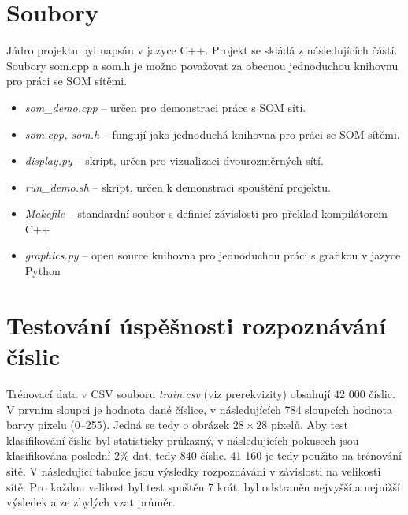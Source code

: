 \documentclass[12pt]{article}
\begin{document}
\section*{Soubory}
Jádro projektu byl napsán v jazyce C++. Projekt se skládá z následujících částí. Soubory som.cpp a som.h je možno považovat za obecnou jednoduchou knihovnu pro práci se SOM sítěmi.

\begin{itemize}
    \item \textit{som\_demo.cpp} -- určen pro demonstraci práce s SOM sítí.
    \item \textit{som.cpp, som.h} -- fungují jako jednoduchá knihovna pro práci se SOM sítěmi.
    \item \textit{display.py} -- skript, určen pro vizualizaci dvourozměrných sítí.
    \item \textit{run\_demo.sh} -- skript, určen k demonstraci spouštění projektu.
    \item \textit{Makefile} -- standardní soubor s definicí závislostí pro překlad kompilátorem C++ 
    \item \textit{graphics.py} -- open source knihovna pro jednoduchou práci s grafikou v jazyce Python
\end{itemize}
	
\section*{Testování úspěšnosti rozpoznávání číslic}

Trénovací data v CSV souboru \textit{train.csv} (viz prerekvizity) obsahují 42 000 číslic. V prvním sloupci je hodnota dané číslice, v následujících 784 sloupcích hodnota barvy pixelu (0--255). Jedná se tedy o obrázek $28\times28$ pixelů. Aby test klasifikování číslic byl statisticky průkazný, v následujících pokusech jsou klasifikována poslední 2\% dat, tedy 840 číslic. 41 160 je tedy použito na trénování sítě. V následující tabulce jsou výsledky rozpoznávání v závislosti na velikosti sítě. Pro každou velikost byl test spuštěn 7 krát, byl odstraněn nejvyšší a nejnižší výsledek a ze zbylých vzat průměr.

\
\end{document}

